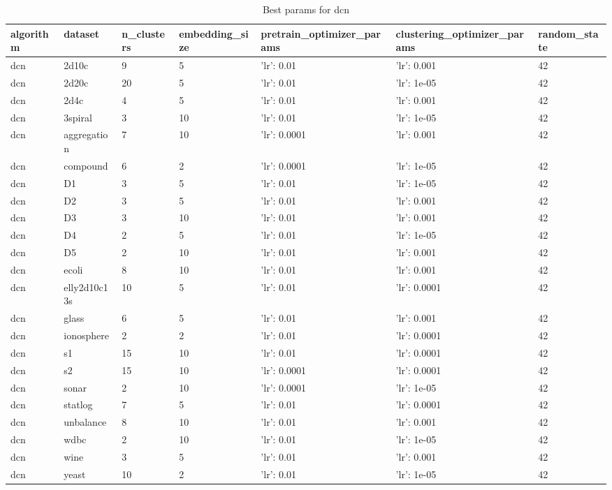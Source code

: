 \begin{table}[H]
\centering
\caption{Best params for dcn}
\label{tab:params:dcn}
\begin{tabular}{|l|l|l|l|l|l|l|}
\hline
algorithm & dataset & n\_clusters & embedding\_size & pretrain\_optimizer\_params & clustering\_optimizer\_params & random\_state \\
\hline
dcn & 2d10c & 9 & 5 & {'lr': 0.01} & {'lr': 0.001} & 42 \\
\hline
dcn & 2d20c & 20 & 5 & {'lr': 0.01} & {'lr': 1e-05} & 42 \\
\hline
dcn & 2d4c & 4 & 5 & {'lr': 0.01} & {'lr': 0.001} & 42 \\
\hline
dcn & 3spiral & 3 & 10 & {'lr': 0.01} & {'lr': 1e-05} & 42 \\
\hline
dcn & aggregation & 7 & 10 & {'lr': 0.0001} & {'lr': 0.001} & 42 \\
\hline
dcn & compound & 6 & 2 & {'lr': 0.0001} & {'lr': 1e-05} & 42 \\
\hline
dcn & D1 & 3 & 5 & {'lr': 0.01} & {'lr': 1e-05} & 42 \\
\hline
dcn & D2 & 3 & 5 & {'lr': 0.01} & {'lr': 0.001} & 42 \\
\hline
dcn & D3 & 3 & 10 & {'lr': 0.01} & {'lr': 0.001} & 42 \\
\hline
dcn & D4 & 2 & 5 & {'lr': 0.01} & {'lr': 1e-05} & 42 \\
\hline
dcn & D5 & 2 & 10 & {'lr': 0.01} & {'lr': 0.001} & 42 \\
\hline
dcn & ecoli & 8 & 10 & {'lr': 0.01} & {'lr': 0.001} & 42 \\
\hline
dcn & elly2d10c13s & 10 & 5 & {'lr': 0.01} & {'lr': 0.0001} & 42 \\
\hline
dcn & glass & 6 & 5 & {'lr': 0.01} & {'lr': 0.001} & 42 \\
\hline
dcn & ionosphere & 2 & 2 & {'lr': 0.01} & {'lr': 0.0001} & 42 \\
\hline
dcn & s1 & 15 & 10 & {'lr': 0.01} & {'lr': 0.0001} & 42 \\
\hline
dcn & s2 & 15 & 10 & {'lr': 0.0001} & {'lr': 0.0001} & 42 \\
\hline
dcn & sonar & 2 & 10 & {'lr': 0.0001} & {'lr': 1e-05} & 42 \\
\hline
dcn & statlog & 7 & 5 & {'lr': 0.01} & {'lr': 0.0001} & 42 \\
\hline
dcn & unbalance & 8 & 10 & {'lr': 0.01} & {'lr': 0.001} & 42 \\
\hline
dcn & wdbc & 2 & 10 & {'lr': 0.01} & {'lr': 1e-05} & 42 \\
\hline
dcn & wine & 3 & 5 & {'lr': 0.01} & {'lr': 0.001} & 42 \\
\hline
dcn & yeast & 10 & 2 & {'lr': 0.01} & {'lr': 1e-05} & 42 \\
\hline
\end{tabular}
\end{table}